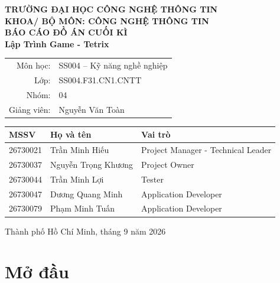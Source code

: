 \documentclass[12pt,a4paper]{article}
\begin{document}
\begin{titlepage}
  \centering
  \vspace*{1.2cm}
  {\large \textbf{TRƯỜNG ĐẠI HỌC CÔNG NGHỆ THÔNG TIN}}\\[0.25cm]
  {\large \textbf{KHOA/ BỘ MÔN: CÔNG NGHỆ THÔNG TIN}}\\[2.0cm]

  {\Large \textbf{BÁO CÁO ĐỒ ÁN CUỐI KÌ}}\\[0.6cm]
  {\Huge \textbf{Lập Trình Game - Tetrix}}\\[0.5cm]

  \begin{tabular}{rl}
    Môn học: & SS004 -- Kỹ năng nghề nghiệp \\
    Lớp: & SS004.F31.CN1.CNTT \\
    Nhóm: & 04 \\
    Giảng viên: & Nguyễn Văn Toàn \\
  \end{tabular}

  \vfill
\begin{tabular}{lll}
  \textbf{MSSV} & \textbf{Họ và tên} & \textbf{Vai trò} \\
  \midrule
  26730021 & Trần Minh Hiếu & Project Manager - Technical Leader \\
  26730037 & Nguyễn Trọng Khương & Project Owner \\
  26730044 & Trần Minh Lợi & Tester \\
  26730047 & Dương Quang Minh & Application Developer \\
  26730079 & Phạm Minh Tuấn & Application Developer \\
\end{tabular}

  \vfill
  Thành phố Hồ Chí Minh, tháng 9 năm 2026
\end{titlepage}

\tableofcontents
\newpage


\section{Mở đầu}
\end{document}

